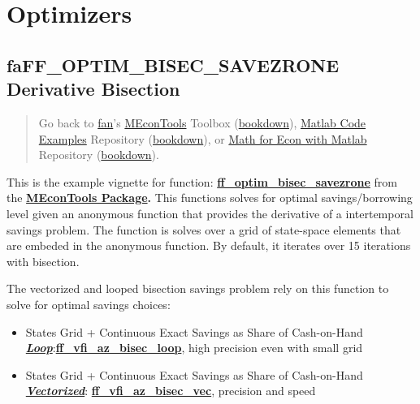 \documentclass[
]{book}
\begin{document}
\hypertarget{optimizers}{%
\chapter{Optimizers}\label{optimizers}}

\hypertarget{faff_optim_bisec_savezrone-derivative-bisection}{%
\section{faFF\_OPTIM\_BISEC\_SAVEZRONE Derivative Bisection}\label{faff_optim_bisec_savezrone-derivative-bisection}}

\begin{quote}
Go back to \href{http://fanwangecon.github.io/}{fan}'s \href{https://fanwangecon.github.io/MEconTools/}{MEconTools} Toolbox (\href{https://fanwangecon.github.io/MEconTools/bookdown}{bookdown}), \href{https://fanwangecon.github.io/M4Econ/}{Matlab Code Examples} Repository (\href{https://fanwangecon.github.io/M4Econ/bookdown}{bookdown}), or \href{https://fanwangecon.github.io/Math4Econ/}{Math for Econ with Matlab} Repository (\href{https://fanwangecon.github.io/Math4Econ/bookdown}{bookdown}).
\end{quote}

This is the example vignette for function:
\href{https://github.com/FanWangEcon//MEconTools/blob/master/MEconTools/optim/ff_optim_bisec_savezrone.m}{\textbf{ff\_optim\_bisec\_savezrone}}
from the \href{https://fanwangecon.github.io/MEconTools/}{\textbf{MEconTools
Package}}\textbf{.} This
functions solves for optimal savings/borrowing level given an anonymous
function that provides the derivative of a intertemporal savings
problem. The function is solves over a grid of state-space elements that
are embeded in the anonymous function. By default, it iterates over 15
iterations with bisection.

The vectorized and looped bisection savings problem rely on this
function to solve for optimal savings choices:

\begin{itemize}
\item
  States Grid + Continuous Exact Savings as Share of Cash-on-Hand
  \underline{\textbf{\emph{Loop}}}:\href{https://github.com/FanWangEcon/MEconTools/blob/master/MEconTools/vfi/ff_vfi_az_bisec_loop.m}{\textbf{ff\_vfi\_az\_bisec\_loop}},
  high precision even with small grid
\item
  States Grid + Continuous Exact Savings as Share of Cash-on-Hand
  \underline{\textbf{\emph{Vectorized}}}:
  \href{https://github.com/FanWangEcon/MEconTools/blob/master/MEconTools/vfi/ff_vfi_az_bisec_vec.m}{\textbf{ff\_vfi\_az\_bisec\_vec}},
  precision and speed
\end{itemize}
\end{document}
